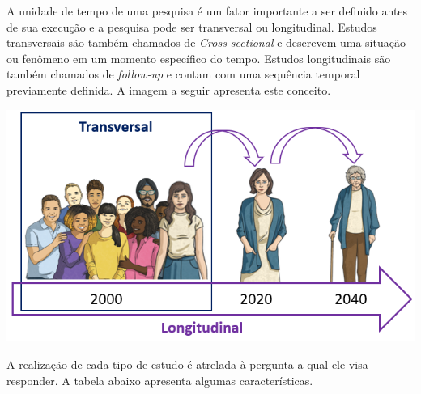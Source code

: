 \documentclass[
]{book}
\begin{document}
A unidade de tempo de uma pesquisa é um fator importante a ser definido antes de sua execução e a pesquisa pode ser transversal ou longitudinal. Estudos transversais são também chamados de \emph{Cross-sectional} e descrevem uma situação ou fenômeno em um momento específico do tempo. Estudos longitudinais são também chamados de \emph{follow-up} e contam com uma sequência temporal previamente definida. A imagem a seguir apresenta este conceito.

\includegraphics{./img/cap_transversal_longitudinal.png}

A realização de cada tipo de estudo é atrelada à pergunta a qual ele visa responder. A tabela abaixo apresenta algumas características.
\end{document}
